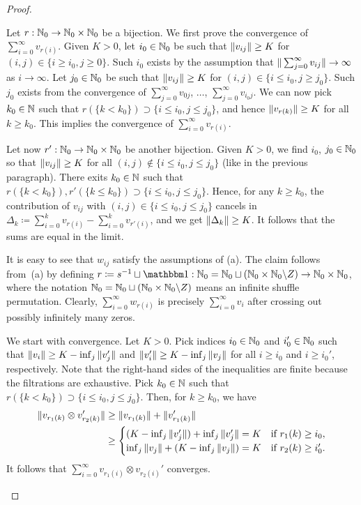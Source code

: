 \documentclass[\MainFolder/Text.tex]{subfiles}
\begin{document}
\begin{proof}
\begin{ProofList}
\item Let $r:\mathbb{N}_0\rightarrow\mathbb{N}_0\times\mathbb{N}_0$ be a bijection. We first prove the convergence of $\sum_{i=0}^\infty v_{r(i)}$. Given $K>0$, let $i_0\in\mathbb{N}_0$ be such that $\| v_{ij} \|\ge K$ for $(i,j)\in \{i\ge i_0, j\ge 0\}$. Such $i_0$ exists by the assumption that $\| \sum_{j=0}^\infty v_{ij} \|\to \infty$ as $i\to \infty$. Let $j_0\in \mathbb{N}_0$ be such that $\| v_{ij} \|\ge K$ for $(i,j)\in \{i \le i_0, j\ge j_0\}$. Such $j_0$ exists from the convergence of $\sum_{j=0}^\infty v_{0j}$, $\dotsc$, $\sum_{j=0}^\infty v_{i_0 j}$. We can now pick $k_0\in \mathbb{N}$ such that $r(\{k< k_0\}) \supset \{i\le i_0, j\le j_0\}$, and hence $\| v_{r(k)} \|\ge K$ for all $k\ge k_0$. This implies the convergence of $\sum_{i=0}^\infty v_{r(i)}$.

Let now $r': \mathbb{N}_0 \rightarrow \mathbb{N}_0 \times \mathbb{N}_0$ be another bijection. Given $K>0$, we find $i_0$, $j_0\in \mathbb{N}_0$ so that $\| v_{ij} \|\ge K$ for all $(i,j)\not\in\{i\le i_0, j\le j_0\}$ (like in the previous paragraph). There exits $k_0\in \mathbb{N}$ such that $r(\{k < k_0\}), r'(\{k \le k_0\}) \supset \{i\le i_0, j\le j_0\}$. Hence, for any $k\ge k_0$, the contribution of $v_{ij}$ with $(i,j)\in\{i\le i_0, j\le j_0\}$ cancels in $\Delta_k \coloneqq \sum_{i=0}^k v_{r(i)} - \sum_{i=0}^k v_{r'(i)}$, and we get $\| \Delta_k \| \ge K$. It follows that the sums are equal in the limit.
\item It is easy to see that $w_{ij}$ satisfy the assumptions of (a). The claim follows from~(a) by defining $r\coloneqq s^{-1}\sqcup \Id: \N_0 = \N_0 \sqcup (\N_0\times \N_0\backslash Z) \rightarrow \N_0\times \N_0$, where the notation $\mathbb{N}_0 = \mathbb{N}_0 \sqcup (\mathbb{N}_0\times \mathbb{N}_0\backslash Z)$ means an infinite shuffle permutation. Clearly, $\sum_{i=0}^\infty w_{r(i)}$ is precisely $\sum_{i=0}^\infty v_i$ after crossing out possibly infinitely many zeros.

\item We start with convergence. Let $K>0$. Pick indices $i_0\in \mathbb{N}_0$ and $i_0'\in\mathbb{N}_0$ such that $\| v_i \| \ge K - \inf_j \| v_j' \|$ and $\| v_i' \|\ge K - \inf_j \| v_j \|$ for all $i\ge i_0$ and $i\ge i_0'$, respectively. Note that the right-hand sides of the inequalities are finite because the filtrations are exhaustive. Pick $k_0\in\mathbb{N}$ such that $r(\{k<k_0\})\supset\{i\le i_0, j\le j_0\}$. Then, for $k\ge k_0$, we have 
\begin{align*}
\| v_{r_1(k)} \otimes v_{r_2(k)}' \| &\ge \| v_{r_1(k)} \| + \| v_{r_1(k)}' \|\\
&\ge \begin{cases}
(K - \inf_j \| v_j' \|) + \inf_j \| v_j' \| = K & \text{if }r_1(k)\ge i_0, \\
 \inf_j \| v_j \| + (K - \inf_j \| v_j \|) = K & \text{if }r_2(k)\ge i_0'.
\end{cases}
\end{align*}
It follows that $\sum_{i=0}^\infty v_{r_1(i)}\otimes v_{r_2(i)}'$ converges.


\end{ProofList}
\end{proof}
\end{document}
